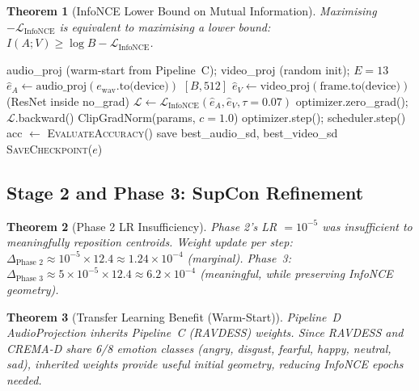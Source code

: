 \documentclass[12pt,a4paper]{article}
\theoremstyle{definition}
\theoremstyle{plain}
\newtheorem{theorem}{Theorem}[section]
\theoremstyle{remark}
\begin{document}
\begin{theorem}[InfoNCE Lower Bound on Mutual Information]
Maximising $-\mathcal{L}_{\text{InfoNCE}}$ is equivalent to maximising a lower bound:
$I(A; V) \ge \log B - \mathcal{L}_{\text{InfoNCE}}$.
\end{theorem}

\begin{algorithm}[H]
\caption{Stage 1: Full Cross-Modal InfoNCE Training (13 epochs)}
\label{alg:stage1_d}
\begin{algorithmic}[1]
\Require audio\_proj (warm-start from Pipeline~C); video\_proj (random init); $E = 13$
    \State $\hat{e}_A \gets \text{audio\_proj}(e_{\text{wav}}.\text{to(device)})$ \quad $[B,512]$
    \State $\hat{e}_V \gets \text{video\_proj}(\text{frame}.\text{to(device)})$ \quad (ResNet inside no\_grad)
    \State $\mathcal{L} \gets \mathcal{L}_{\text{InfoNCE}}(\hat{e}_A, \hat{e}_V, \tau{=}0.07)$
    \State optimizer.zero\_grad(); $\mathcal{L}$.backward()
    \State ClipGradNorm(params, $c = 1.0$)
    \State optimizer.step(); scheduler.step()
  \EndFor
  \State acc $\gets$ \textsc{EvaluateAccuracy}()
   save best\_audio\_sd, best\_video\_sd \EndIf
  \State \textsc{SaveCheckpoint}($e$)
\EndFor
\end{algorithmic}
\end{algorithm}

\subsection{Stage 2 and Phase 3: SupCon Refinement}

\begin{theorem}[Phase 2 LR Insufficiency]
Phase 2's LR $= 10^{-5}$ was insufficient to meaningfully reposition centroids. Weight update per step:
$\Delta_{\text{Phase 2}} \approx 10^{-5} \times 12.4 \approx 1.24 \times 10^{-4}$ (marginal). Phase~3: $\Delta_{\text{Phase 3}} \approx 5 \times 10^{-5} \times 12.4 \approx 6.2 \times 10^{-4}$ (meaningful, while preserving InfoNCE geometry).
\end{theorem}

\begin{theorem}[Transfer Learning Benefit (Warm-Start)]
Pipeline~D AudioProjection inherits Pipeline~C (RAVDESS) weights. Since RAVDESS and CREMA-D share 6/8 emotion classes (\textit{angry, disgust, fearful, happy, neutral, sad}), inherited weights provide useful initial geometry, reducing InfoNCE epochs needed.
\end{theorem}
\end{document}
